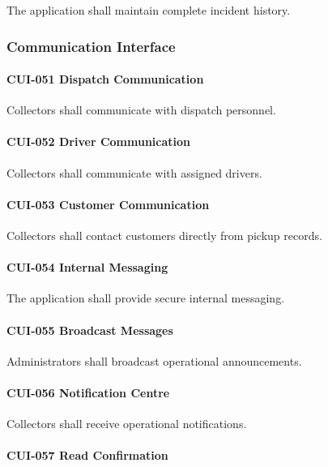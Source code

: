 The application shall maintain complete incident history.


\subsubsection*{Communication Interface}

\paragraph{CUI-051 Dispatch Communication}

Collectors shall communicate with dispatch personnel.

\paragraph{CUI-052 Driver Communication}

Collectors shall communicate with assigned drivers.

\paragraph{CUI-053 Customer Communication}

Collectors shall contact customers directly from pickup records.

\paragraph{CUI-054 Internal Messaging}

The application shall provide secure internal messaging.

\paragraph{CUI-055 Broadcast Messages}

Administrators shall broadcast operational announcements.

\paragraph{CUI-056 Notification Centre}

Collectors shall receive operational notifications.

\paragraph{CUI-057 Read Confirmation}


